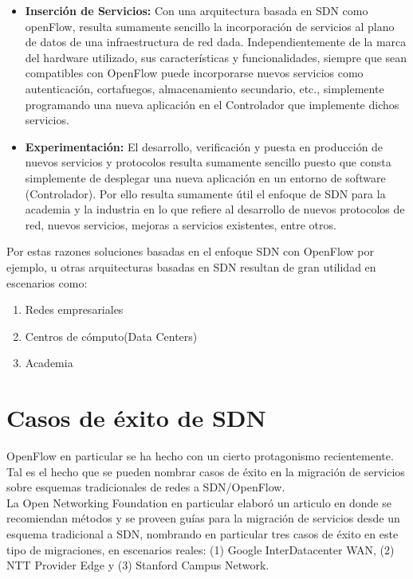 \begin{itemize}
\item \textbf{Inserción de Servicios:}
Con una arquitectura basada en SDN como openFlow, resulta sumamente sencillo la incorporación de servicios al plano de datos de una infraestructura de red dada. Independientemente de la marca del hardware utilizado, sus características y funcionalidades, siempre que sean compatibles con OpenFlow puede incorporarse nuevos servicios como autenticación, cortafuegos, almacenamiento secundario, etc., simplemente programando una nueva aplicación en el Controlador que implemente dichos servicios.

\item \textbf{Experimentación:}
El desarrollo, verificación y puesta en producción de nuevos servicios y protocolos resulta sumamente sencillo puesto que consta simplemente de desplegar una nueva aplicación en un entorno de software (Controlador). Por ello resulta sumamente útil el enfoque de SDN para la academia y la industria en lo que refiere al desarrollo de nuevos protocolos de red, nuevos servicios, mejoras a servicios existentes, entre otros.

\end{itemize}

Por estas razones soluciones basadas en el enfoque SDN con OpenFlow por ejemplo, u otras arquitecturas basadas en SDN resultan de gran utilidad en escenarios como:

\begin{enumerate}
\item Redes empresariales
\item Centros de cómputo(Data Centers)
\item Academia
\end{enumerate}

\section{Casos de éxito de SDN}
OpenFlow en particular se ha hecho con un cierto protagonismo recientemente. Tal es el hecho que se pueden nombrar casos de éxito en la migración de servicios sobre esquemas tradicionales de redes a SDN/OpenFlow.\\

La Open Networking Foundation en particular elabor\'o un articulo\cite{ONFSuccessCase} en donde se recomiendan métodos y se proveen guías para la migración de servicios desde un esquema tradicional a SDN, nombrando en particular tres casos de éxito en este tipo de migraciones, en escenarios reales: (1) Google InterDatacenter WAN, (2) NTT Provider Edge y (3) Stanford Campus Network.


